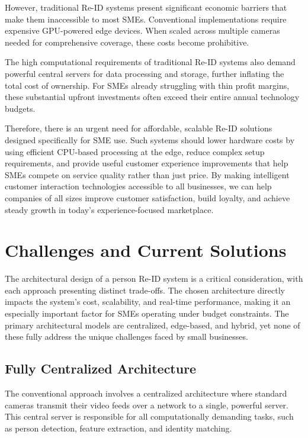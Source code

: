 \documentclass[../main.tex]{subfiles}
\begin{document}
However, traditional Re-ID systems present significant economic barriers that make them inaccessible to most SMEs. Conventional implementations require \\ expensive GPU-powered edge devices. When scaled across multiple cameras needed for comprehensive coverage, these costs become prohibitive.

The high computational requirements of traditional Re-ID systems also demand powerful central servers for data processing and storage, further inflating the total cost of ownership. For SMEs already struggling with thin profit margins, these substantial upfront investments often exceed their entire annual technology budgets.

Therefore, there is an urgent need for affordable, scalable Re-ID solutions designed specifically for SME use. Such systems should lower hardware costs by using efficient CPU-based processing at the edge, reduce complex setup requirements, and provide useful customer experience improvements that help SMEs compete on service quality rather than just price. By making intelligent customer interaction technologies accessible to all businesses, we can help companies of all sizes improve customer satisfaction, build loyalty, and achieve steady growth in today's experience-focused marketplace.

\section{Challenges and Current Solutions}
\label{sec:tentative}

The architectural design of a person Re-ID system is a critical consideration, with each approach presenting distinct trade-offs. The chosen architecture directly impacts the system's cost, scalability, and real-time performance, making it an especially important factor for SMEs operating under budget constraints. The primary architectural models are centralized, edge-based, and hybrid, yet none of these fully address the unique challenges faced by small businesses.

\subsection{Fully Centralized Architecture}
The conventional approach involves a centralized architecture where standard cameras transmit their video feeds over a network to a single, powerful server. This central server is responsible for all computationally demanding tasks, such as person detection, feature extraction, and identity matching.
\end{document}
